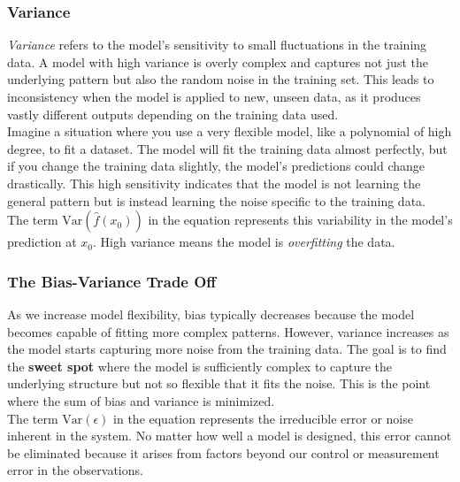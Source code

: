 \subsubsection{Variance}

\textit{Variance} refers to the model's sensitivity to small fluctuations in the training data. A model with high variance is overly complex and captures not just the underlying pattern but also the random noise in the training set. This leads to inconsistency when the model is applied to new, unseen data, as it produces vastly different outputs depending on the training data used.\\

Imagine a situation where you use a very flexible model, like a polynomial of high degree, to fit a dataset. The model will fit the training data almost perfectly, but if you change the training data slightly, the model's predictions could change drastically. This high sensitivity indicates that the model is not learning the general pattern but is instead learning the noise specific to the training data.\\

The term \( \text{Var}(\hat{f}(x_0)) \) in the equation represents this variability in the model's prediction at \( x_0 \). High variance means the model is \textit{overfitting} the data.

\subsubsection{The Bias-Variance Trade Off}

As we increase model flexibility, bias typically decreases because the model becomes capable of fitting more complex patterns. However, variance increases as the model starts capturing more noise from the training data. The goal is to find the \textbf{sweet spot} where the model is sufficiently complex to capture the underlying structure but not so flexible that it fits the noise. This is the point where the sum of bias and variance is minimized.\\

The term \( \text{Var}(\epsilon) \) in the equation represents the irreducible error or noise inherent in the system. No matter how well a model is designed, this error cannot be eliminated because it arises from factors beyond our control or measurement error in the observations.
